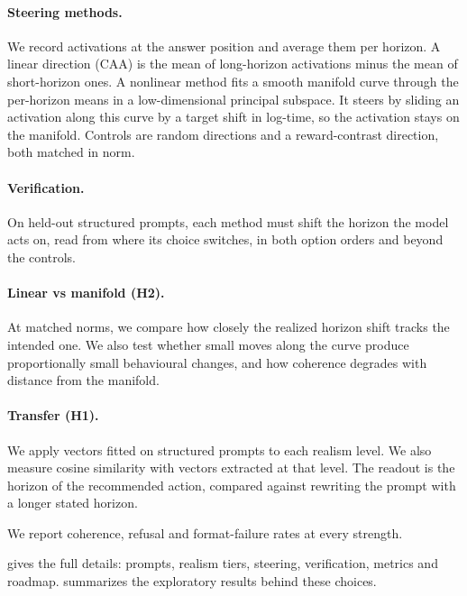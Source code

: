 \documentclass[midterm]{sparreport}
\begin{document}
\paragraph{Steering methods.} We record activations at the answer position and average them per horizon. A linear direction (CAA) is the mean of long-horizon activations minus the mean of short-horizon ones. A nonlinear method fits a smooth manifold curve through the per-horizon means in a low-dimensional principal subspace. It steers by sliding an activation along this curve by a target shift in log-time, so the activation stays on the manifold. Controls are random directions and a reward-contrast direction, both matched in norm.

\paragraph{Verification.} On held-out structured prompts, each method must shift the horizon the model acts on, read from where its choice switches, in both option orders and beyond the controls.

\paragraph{Linear vs manifold (H2).} At matched norms, we compare how closely the realized horizon shift tracks the intended one. We also test whether small moves along the curve produce proportionally small behavioural changes, and how coherence degrades with distance from the manifold.

\paragraph{Transfer (H1).} We apply vectors fitted on structured prompts to each realism level. We also measure cosine similarity with vectors extracted at that level. The readout is the horizon of the recommended action, compared against rewriting the prompt with a longer stated horizon.

We report coherence, refusal and format-failure rates at every strength.

\vspace{1em}

 gives the full details: prompts, realism tiers, steering, verification, metrics and roadmap.  summarizes the exploratory results behind these choices.

\end{document}
